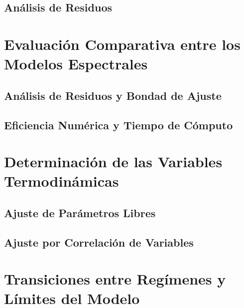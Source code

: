 \subsection{Análisis de Residuos}
\section{Evaluación Comparativa entre los Modelos Espectrales}
\subsection{Análisis de Residuos y Bondad de Ajuste}
\subsection{Eficiencia Numérica y Tiempo de Cómputo}
\section{Determinación de las Variables Termodinámicas}
\subsection{Ajuste de Parámetros Libres}
\subsection{Ajuste por Correlación de Variables}
\section{Transiciones entre Regímenes y Límites del Modelo}

